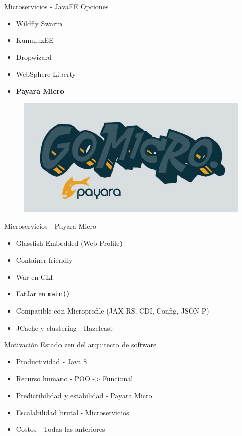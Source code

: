 \documentclass{beamer}
\begin{document}
\begin{frame}{Microservicios - JavaEE}
Opciones
\begin{itemize}
	\item Wildfly Swarm
	\item KumuluzEE
	\item Dropwizard
	\item WebSphere Liberty
	\item \textbf{Payara Micro}
\end{itemize}

\begin{figure}
	\centering
	\includegraphics[width=0.5\linewidth]{Images/payaramicro}
\end{figure}
\end{frame}

\begin{frame}{Microservicios - Payara Micro}
\begin{itemize}
	\item Glassfish Embedded (Web Profile)
	\item Container friendly
	\item War en CLI
	\item FatJar en \texttt{main()}
	\item Compatible con Microprofile (JAX-RS, CDI, Config, JSON-P)
	\item JCache y clustering - Hazelcast
\end{itemize}
\end{frame}

\begin{frame}{Motivación}
Estado zen del arquitecto de software
\begin{itemize}
	\item Productividad - Java 8
	\item Recurso humano - POO -> Funcional
	\item Predictibilidad y estabilidad - Payara Micro
	\item Escalabilidad brutal - Microservicios
	\item Costos - Todas las anteriores
\end{itemize}
\end{frame}
\end{document}
